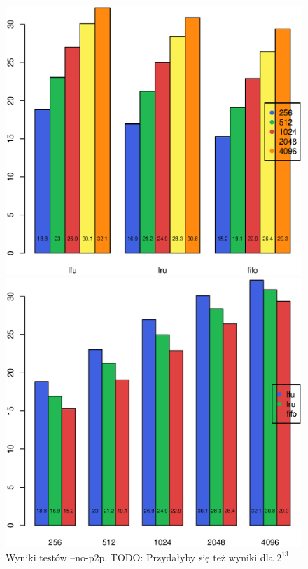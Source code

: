\documentclass[a4paper,11pt]{scrartcl}
\begin{document}
\begin{figure}[h!]
\centering
\begin{minipage}{0.48\linewidth}
\includegraphics[width=0.95\linewidth]{img/nop2p_mean_1.eps}
\end{minipage}
\begin{minipage}{0.48\linewidth}
\includegraphics[width=0.95\linewidth]{img/nop2p_mean_2.eps}
\end{minipage}
\caption{Wyniki testów --no-p2p. TODO: Przydałyby się też wyniki dla $2^{13}$}
\label{fig_tests_mem_1}
\end{figure}
\end{document}
